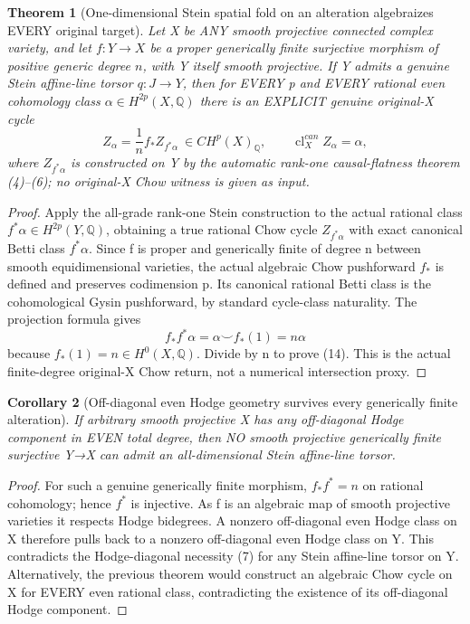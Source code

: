 \documentclass[11pt]{article}
\newtheorem{theorem}{Theorem}
\newtheorem{corollary}[theorem]{Corollary}
\begin{document}
\begin{theorem}[One-dimensional Stein spatial fold on an alteration algebraizes EVERY original target]
Let X be ANY smooth projective connected complex variety,
and let $f:Y\to X$ be a proper generically finite
surjective morphism of positive generic degree
$n$, with Y itself smooth projective.
If Y admits a genuine Stein affine-line torsor
$q:J\to Y$, then for EVERY p and EVERY
rational even cohomology class
$\alpha\in H^{2p}(X,\mathbb Q)$ there is
an EXPLICIT genuine original-X cycle
\[
 \boxed{
 Z_\alpha=\frac1n f_* Z_{f^*\alpha}
    \ \in CH^p(X)_{\mathbb Q},\qquad
 \operatorname{cl}^{can}_X Z_\alpha=\alpha,
 }                                                        \tag{14}
\]
where $Z_{f^*\alpha}$ is constructed on
Y by the automatic rank-one causal-flatness
theorem (4)--(6); no original-X Chow
witness is given as input.
\end{theorem}
\begin{proof}
Apply the all-grade rank-one Stein
construction to the actual rational
class $f^*\alpha\in H^{2p}(Y,\mathbb Q)$,
obtaining a true rational Chow cycle
$Z_{f^*\alpha}$ with exact canonical
Betti class $f^*\alpha$.
Since f is proper and generically finite
of degree n between smooth equidimensional
varieties, the actual algebraic Chow
pushforward $f_*$ is defined and preserves
codimension p. Its canonical rational
Betti class is the cohomological Gysin
pushforward, by standard cycle-class
naturality. The projection formula gives
\[
 f_*f^*\alpha=\alpha\smile f_*(1)
                 =n\alpha
\]
because $f_*(1)=n\in H^0(X,\mathbb Q)$.
Divide by n to prove (14).
This is the actual finite-degree
original-X Chow return, not a
numerical intersection proxy.
\end{proof}

\begin{corollary}[Off-diagonal even Hodge geometry survives every generically finite alteration]
If arbitrary smooth projective X
has any off-diagonal Hodge component
in EVEN total degree, then NO
smooth projective generically finite
surjective Y→X can admit an
all-dimensional Stein affine-line
torsor.
\end{corollary}
\begin{proof}
For such a genuine generically finite
morphism, $f_*f^*=n$ on rational
cohomology; hence $f^*$ is injective.
As f is an algebraic map of smooth
projective varieties it respects
Hodge bidegrees. A nonzero
off-diagonal even Hodge class
on X therefore pulls back to a
nonzero off-diagonal even Hodge
class on Y. This contradicts
the Hodge-diagonal necessity
(7) for any Stein affine-line
torsor on Y. Alternatively,
the previous theorem would
construct an algebraic Chow cycle
on X for EVERY even rational class,
contradicting the existence of
its off-diagonal Hodge component.
\end{proof}
\end{document}
